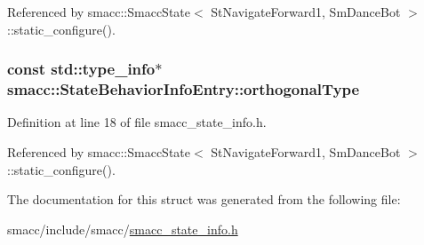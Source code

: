 Referenced by smacc\+::\+Smacc\+State$<$ St\+Navigate\+Forward1, Sm\+Dance\+Bot $>$\+::static\+\_\+configure().

\subsubsection[{\texorpdfstring{orthogonal\+Type}{orthogonalType}}]{\setlength{\rightskip}{0pt plus 5cm}const std\+::type\+\_\+info$\ast$ smacc\+::\+State\+Behavior\+Info\+Entry\+::orthogonal\+Type}\hypertarget{structsmacc_1_1StateBehaviorInfoEntry_aefc43616f2bd059594b3b90d6ad47916}{}\label{structsmacc_1_1StateBehaviorInfoEntry_aefc43616f2bd059594b3b90d6ad47916}


Definition at line 18 of file smacc\+\_\+state\+\_\+info.\+h.



Referenced by smacc\+::\+Smacc\+State$<$ St\+Navigate\+Forward1, Sm\+Dance\+Bot $>$\+::static\+\_\+configure().



The documentation for this struct was generated from the following file\+:\begin{DoxyCompactItemize}
\item 
smacc/include/smacc/\hyperlink{smacc__state__info_8h}{smacc\+\_\+state\+\_\+info.\+h}\end{DoxyCompactItemize}
